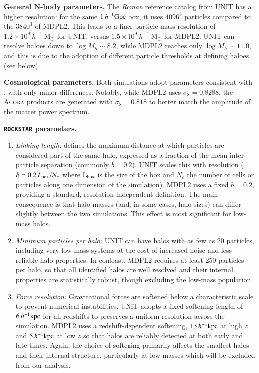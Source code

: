 \documentclass[]{aa} %
\begin{document}
\begin{list}{}{}
    \item [\textbullet] \textbf{General N-body parameters.} The \emph{Roman} reference catalog from UNIT has a higher resolution: for the same $1\,h^{-1}{\rm Gpc}$ box, it uses $4096^3$ particles compared to the $3840^{3}$ of MDPL2. This leads to a finer particle mass resolution of $1.2 \times 10^9~h^{-1}~$M$_{\odot}$ for UNIT, versus $1.5\times 10^9~h^{-1}~$M$_{\odot}$ for MDPL2. UNIT can resolve haloes down to $\log M_h \sim 8.2$, while MDPL2 reaches only $\log M_h \sim 11.0$, and this is due to the adoption of different particle thresholds at defining haloes (see below). 

    \item [\textbullet] \textbf{Cosmological parameters.} Both simulations adopt parameters consistent with \citep{ade2016planck}, with only minor differences. Notably, while MDPL2 uses $\sigma_8 = 0.8288$, the \textsc{Agora} products are generated with $\sigma_8 = 0.818$ to better match the amplitude of the matter power spectrum.

    \item [\textbullet]\textbf{\texttt{ROCKSTAR} parameters.} 
\begin{enumerate}
	\item \textit{Linking length:} defines the maximum distance at which particles are considered part of the same halo, expressed as a fraction of the mean inter-particle separation (commonly $b=0.2$). UNIT scales this with resolution ($b = 0.2\,L_{\rm box}/N_c$ where $\rm L_{ box}$ is the size of the box and $N_c$ the number of cells or particles along one dimension of the simulation). MDPL2 uses a fixed $b=0.2$, providing a standard, resolution-independent definition. The main consequence is that halo masses (and, in some cases, halo sizes) can differ slightly between the two simulations. This effect is most significant for low-mass halos.
    \item \textit{Minimum particles per halo:} UNIT can have halos with as few as 20 particles, including very low-mass systems at the cost of increased noise and less reliable halo properties. In contrast, MDPL2 requires at least 250 particles per halo, so that all identified halos are well resolved and their internal properties are statistically robust, though excluding the low-mass population. 
\item \textit{Force resolution:} Gravitational forces are softened below a characteristic scale to prevent numerical instabilities. UNIT adopts a fixed softening length of $6\,h^{-1}{\rm kpc}$ for all redshifts to preserves a uniform resolution across the simulation. MDPL2 uses a redshift-dependent softening, $13\,h^{-1}{\rm kpc}$ at high $z$ and $5\,h^{-1}{\rm kpc}$ at low $z$ so that halos are reliably detected at both early and late times. Again, the choice of softening primarily affects the smallest halos and their internal structure, particularly at low masses which will be excluded from our analysis.
\end{enumerate}
\end{list}
\end{document}
